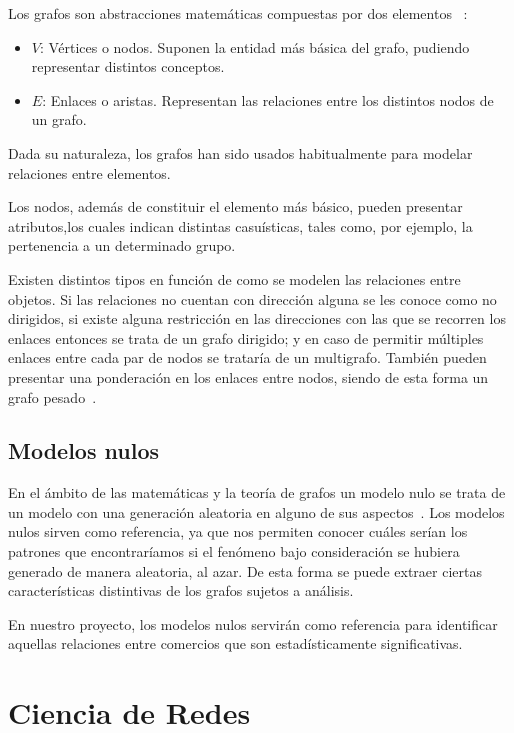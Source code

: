 Los grafos son abstracciones matemáticas compuestas por dos elementos ~\cite{enwiki:1171835383}:

\begin{itemize}
	\item $V$: Vértices o nodos. Suponen la entidad más básica del grafo, pudiendo representar distintos conceptos.
	\item $E$: Enlaces o aristas. Representan las relaciones entre los distintos nodos de un grafo.
\end{itemize}

Dada su naturaleza, los grafos han sido usados habitualmente para modelar relaciones entre elementos.

Los nodos, además de constituir el elemento más básico, pueden presentar atributos,los cuales indican distintas casuísticas, tales como, por ejemplo, la pertenencia a un determinado grupo.

Existen distintos tipos en función de como se modelen las relaciones entre objetos. Si las relaciones no cuentan con dirección alguna se les conoce como no dirigidos, si existe alguna restricción en las direcciones con las que se recorren los enlaces entonces se trata de un grafo dirigido; y en caso de permitir múltiples enlaces entre cada par de nodos se trataría de un multigrafo. También pueden presentar una ponderación en los enlaces entre nodos, siendo de esta forma un grafo pesado~\cite{enwiki:1171835383}.

\subsection{Modelos nulos}

En el ámbito de las matemáticas y la teoría de grafos un modelo nulo se trata de un modelo con una generación aleatoria en alguno de sus aspectos~\cite{enwiki:1169838323}. Los modelos nulos sirven como referencia, ya que nos permiten conocer cuáles serían los patrones que encontraríamos si el fenómeno bajo consideración se hubiera generado de manera aleatoria, al azar. De esta forma se puede extraer ciertas características distintivas de los grafos sujetos a análisis.

En nuestro proyecto, los modelos nulos servirán como referencia para identificar aquellas relaciones entre comercios que son estadísticamente significativas.

\section{Ciencia de Redes}

